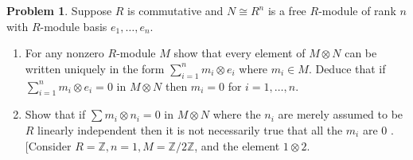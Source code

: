 \documentclass{amsart}
\numberwithin{equation}{section}
\theoremstyle{definition}
\newtheorem{problem}[thm]{Problem}
\begin{document}



\begin{problem}
  Suppose \(R\) is commutative and \(N \cong R^n\) is a free \(R\)-module of rank \(n\) with \(R\)-module basis \(e_1, \ldots, e_n\).
  \begin{enumerate}
  \item For any nonzero \(R\)-module \(M\) show that every element of \(M \otimes N\) can be written uniquely in the form \(\sum_{i=1}^n m_i \otimes e_i\) where \(m_i \in M\). Deduce that if \(\sum_{i=1}^n m_i \otimes e_i=0\) in \(M \otimes N\) then \(m_i=0\) for \(i=1, \ldots, n\).
\item Show that if \(\sum m_i \otimes n_i=0\) in \(M \otimes N\) where the \(n_i\) are merely assumed to be \(R\) linearly independent then it is not necessarily true that all the \(m_i\) are 0 . [Consider \(R=\mathbb{Z}, n=1, M=\mathbb{Z} / 2 \mathbb{Z}\), and the element \(1 \otimes 2\).
  \end{enumerate}
\end{problem}



\end{document}
